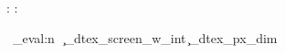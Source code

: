 \documentclass{article}
\begin{document}
\ExplSyntaxOn

\dtexLoadSinTable:
\dtexLoadTextures:

\dtexReadInput
\dtexLoadState

\dtexTick

\dtexCastAll
\vbox
  {
    \offinterlineskip
    \dtexRenderAudio
    \kern 6bp
    \hbox
      {
        \rlap { \dtexRenderFrame }
        \rlap { \dtexDrawSprites }
        \rlap { \dtexDrawWeapon }
        \rlap { \dtexDamageTint }
        \kern \dim_eval:n { \c_dtex_screen_w_int \c_dtex_px_dim }
      }
    \kern 8bp
    \dtexRenderHUD
  }

\dtexSaveState
\ExplSyntaxOff
\end{document}
